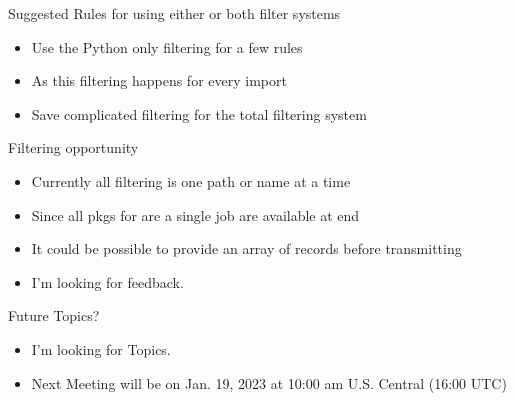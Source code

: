 \documentclass{beamer}
\begin{document}
\begin{frame}{Suggested Rules for using either or both filter systems}
  \begin{itemize}
    \item Use the Python only filtering for a few rules
    \item As this filtering happens for every import
    \item Save complicated filtering for the total filtering system
  \end{itemize}
\end{frame}

\begin{frame}{Filtering opportunity}
  \begin{itemize}
    \item Currently all filtering is one path or name at a time
    \item Since all pkgs for are a single job are available at end
    \item It could be possible to provide an array of records before
      transmitting
    \item I'm looking for feedback. 
  \end{itemize}
\end{frame}

\begin{frame}{Future Topics?}
  \begin{itemize}
    \item I'm looking for Topics.
    \item Next Meeting will be on Jan. 19, 2023 at 10:00 am
      U.S. Central (16:00 UTC)
  \end{itemize}
\end{frame}

%
\end{document}
